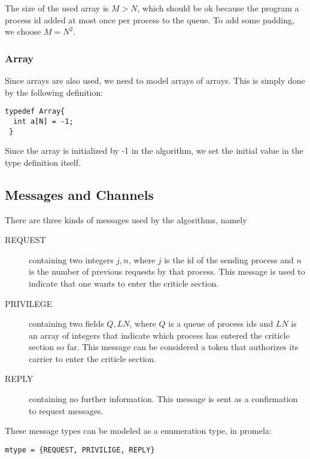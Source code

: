 \documentclass{llncs}
\begin{document}
The size of the used array is $M > N$, which should be ok because the program a process id added at most once per process to the queue. To add some padding, we choose $M = N^2$.

\subsubsection{Array}
Since arrays are also used, we need to model arrays of arrays. This is simply done by the following definition:

\begin{lstlisting}[frame=single,morekeywords=typedef]
 typedef Array{
  int a[N] = -1;
 }
\end{lstlisting}
Since the array is initialized by -1 in the algorithm, we set the initial value in the type definition itself.

\subsection{Messages and Channels}
There are three kinds of messages used by the algorithms, namely
\begin{description}
  \item[REQUEST] containing two integers $j,n$, where $j$ is the
                 id of the sending process and $n$ is the number
                 of previous requests by that process. This message
                 is used to indicate that one wants to enter the
                  criticle section.
  \item[PRIVILEGE] containing two fields $Q,LN$, where $Q$ is a
                   queue of process ids and $LN$ is an array of
                   integers that indicate which process has
                   entered the criticle section so far.
                   This message can be considered a token that
                   authorizes its carrier to enter the criticle
                   section.
  \item[REPLY]   containing no further information. This message
                 is sent as a confirmation to request messages.
\end{description}

\noindent These message types can be modeled as a enumeration type, in promela:

\begin{lstlisting}[morekeywords=mtype,frame=single]
mtype = {REQUEST, PRIVILIGE, REPLY}
\end{lstlisting}
\end{document}
